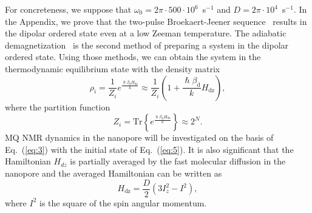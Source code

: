 \documentclass[review]{elsarticle}
\newcommand{\hdz}{H_\mathrm{dz}}
\begin{document}
For concreteness, we suppose that $\omega_{0} = 2\pi \cdot 500 \cdot 10^{6}$~s$^{-1}$ and $D = 2\pi \cdot 10^{4}$~s$^{-1}$.
In the Appendix, we prove that the two-pulse Broekaert-Jeener sequence~\cite{Goldman_1970,Jeener_1967} results in the dipolar ordered state even at a low Zeeman temperature.
The adiabatic demagnetization~\cite{Goldman_1970,Slichter_1961} is the second method of preparing a system in the dipolar ordered state.
Using those methods, we can obtain the system in the thermodynamic equilibrium state with the density matrix
%
\begin{equation}
    \label{eq:5}
    \rho_i = \frac{1}{Z_i} e^\frac{\hslash\beta_\mathrm{d} \hdz}{k}
    \approx \frac{1}{Z_i}(1 + \frac{\hslash\beta_\mathrm{d}}{k} H_\mathrm{dz}),
\end{equation}
%
where the partition function
%
\begin{equation}
    \label{eq:6}
	Z_i = \mathrm{Tr} \left\{ e^\frac{\hslash\beta_\mathrm{d} \hdz}{k} \right\} \approx 2^{N}.
\end{equation}
%
MQ NMR dynamics in the nanopore will be investigated on the basis of Eq.~(\ref{eq:3}) with the initial state of Eq.~(\ref{eq:5}).
It is also significant that the Hamiltonian $H_{dz}$ is partially averaged by the fast molecular diffusion in the nanopore and the averaged Hamiltonian can be written as \cite{Fel_dman_2004,Doronin_2011}
%
\begin{equation}
    \label{eq:7}
    H_\mathrm{dz} = \dfrac{D}{2} (3 I^{2}_{z} - I^{2}) , %
\end{equation}
%
where $I^{2}$ is the square of the spin angular momentum.
\end{document}
